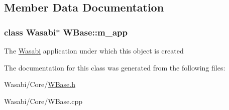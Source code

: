 \subsection{Member Data Documentation}
\subsubsection[{\texorpdfstring{m\+\_\+app}{m_app}}]{\setlength{\rightskip}{0pt plus 5cm}class {\bf Wasabi}$\ast$ W\+Base\+::m\+\_\+app\hspace{0.3cm}{\ttfamily [protected]}}\hypertarget{class_w_base_a1650fafeaee7a217a863b79e9bba9a08}{}\label{class_w_base_a1650fafeaee7a217a863b79e9bba9a08}
The \hyperlink{class_wasabi}{Wasabi} application under which this object is created 

The documentation for this class was generated from the following files\+:\begin{DoxyCompactItemize}
\item 
Wasabi/\+Core/\hyperlink{_w_base_8h}{W\+Base.\+h}\item 
Wasabi/\+Core/W\+Base.\+cpp\end{DoxyCompactItemize}
